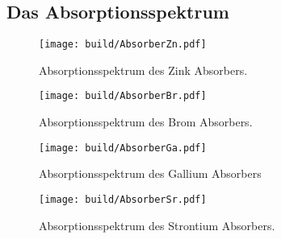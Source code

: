 \subsection{Das Absorptionsspektrum}

\begin{figure}[H]
    \centering
    \texttt{[image: build/AbsorberZn.pdf]}
    \caption{Absorptionsspektrum des Zink Absorbers.}
    \label{fig:AbZn}
\end{figure}

\begin{figure}[H]
    \centering
    \texttt{[image: build/AbsorberBr.pdf]}
    \caption{Absorptionsspektrum des Brom Absorbers.}
    \label{fig:AbBr}
\end{figure}

\begin{figure}[H]
    \centering
    \texttt{[image: build/AbsorberGa.pdf]}
    \caption{Absorptionsspektrum des Gallium Absorbers}
    \label{fig:AbGa}
\end{figure}


\begin{figure}[H]
    \centering
    \texttt{[image: build/AbsorberSr.pdf]}    
    \caption{Absorptionsspektrum des Strontium Absorbers.}
    \label{fig:AbSr}
\end{figure}